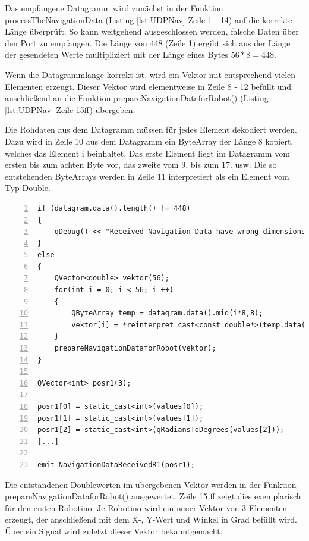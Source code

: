 Das empfangene Datagramm wird zunächst in der Funktion processTheNavigationData (Listing \ref{lst:UDPNav} Zeile 1 - 14) auf die korrekte Länge überprüft. So kann weitgehend ausgeschlossen werden, falsche Daten über den Port zu empfangen. Die Länge von 448 (Zeile 1) ergibt sich aus der Länge der gesendeten Werte multipliziert mit der Länge eines Bytes $56 * 8 = 448$. 

Wenn die Datagrammlänge korrekt ist, wird ein Vektor mit entsprechend vielen Elementen erzeugt. Dieser Vektor wird elementweise in Zeile 8 - 12 befüllt und anschließend an die Funktion prepareNavigationDataforRobot() (Listing \ref{lst:UDPNav} Zeile 15ff) übergeben. 

Die Rohdaten aus dem Datagramm müssen für jedes Element dekodiert werden. Dazu wird in Zeile 10 aus dem Datagramm ein ByteArray der Länge 8 kopiert, welches das Element i beinhaltet. Das erste Element liegt im Datagramm vom ersten bis zum achten Byte vor, das zweite vom 9. bis zum 17. usw. Die so entstehenden ByteArrays werden in Zeile 11 interpretiert als ein Element vom Typ Double. 

\begin{lstlisting}[frame=single, breaklines=true, numbers=left, stepnumber=2, firstnumber=1, numberstyle = \tiny, caption=UDP-Handler Navigationsdatenaustausch,label=lst:UDPNav]
if (datagram.data().length() != 448)
{
    qDebug() << "Received Navigation Data have wrong dimensions: " << datagram.data().length();
}
else
{
    QVector<double> vektor(56);
    for(int i = 0; i < 56; i ++)
    {
        QByteArray temp = datagram.data().mid(i*8,8);
        vektor[i] = *reinterpret_cast<const double*>(temp.data());
    }
    prepareNavigationDataforRobot(vektor);
}

QVector<int> posr1(3);

posr1[0] = static_cast<int>(values[0]);
posr1[1] = static_cast<int>(values[1]);
posr1[2] = static_cast<int>(qRadiansToDegrees(values[2]));
[...]

emit NavigationDataReceivedR1(posr1);

\end{lstlisting}

Die entstandenen Doublewerten im übergebenen Vektor werden in der Funktion prepareNavigationDataforRobot() ausgewertet. Zeile 15 ff zeigt dies exemplarisch für den ersten Robotino. Je Robotino wird ein neuer Vektor von 3 Elementen erzeugt, der anschließend mit dem X-, Y-Wert und Winkel in Grad befüllt wird. Über ein Signal wird zuletzt dieser Vektor bekanntgemacht. 

